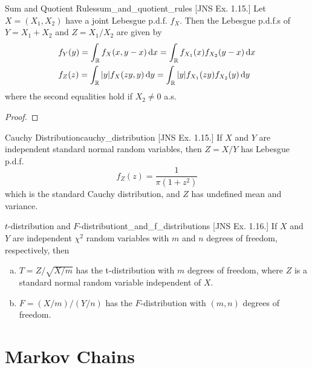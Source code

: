\begin{problem}{Sum and Quotient Rules}{sum_and_quotient_rules}
    [JNS Ex. 1.15.] Let \(X = (X_1, X_2)\) have a joint Lebesgue p.d.f. \(f_X\). Then the Lebesgue p.d.f.s of \(Y = X_1 + X_2\) and \(Z = X_1 / X_2\) are given by
    \begin{align*}
        & f_Y(y) = \int_{\mathbb{R}} f_X(x, y - x) \, \mathrm{d}x
        = \int_{\mathbb{R}} f_{X_1}(x) f_{X_2}(y - x) \, \mathrm{d}x \\
        & f_Z(z) = \int_{\mathbb{R}} |y| f_X(zy, y) \, \mathrm{d}y
        = \int_{\mathbb{R}} |y| f_{X_1}(zy) f_{X_2}(y) \, \mathrm{d}y
    \end{align*}
    where the second equalities hold if \(X_2 \neq 0\) a.s.
\end{problem}

\begin{proof}
\end{proof}

\begin{problem}{Cauchy Distribution}{cauchy_distribution}
    [JNS Ex. 1.15.] If \(X\) and \(Y\) are independent standard normal random variables, then \(Z = X / Y\) has Lebesgue p.d.f.
    \[
        f_Z(z) = \frac{1}{\pi(1 + z^2)}
    \]
    which is the standard Cauchy distribution, and \(Z\) has undefined mean and variance.
\end{problem}

\begin{problem}{$t$-distribution and $F$-distribution}{t_and_f_distributions}
    [JNS Ex. 1.16.] If \(X\) and \(Y\) are independent \(\chi^2\) random variables with \(m\) and \(n\) degrees of freedom, respectively, then
    \begin{enumerate}[(a)]
        \itemsep0em
        \item \(T = Z / \sqrt{X/m}\) has the t-distribution with \(m\) degrees of freedom, where \(Z\) is a standard normal random variable independent of \(X\). 
        \item \(F = (X/m) / (Y/n)\) has the \(F\)-distribution with \((m,n)\) degrees of freedom.
    \end{enumerate}
\end{problem}

\newpage
\section{Markov Chains}




